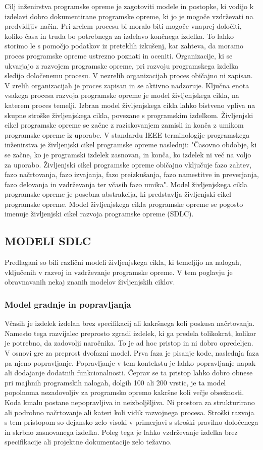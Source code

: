 \documentclass[a4paper,12pt,openright]{book}
\begin{document}
Cilj inženirstva programske opreme je zagotoviti modele in postopke, ki vodijo k izdelavi dobro dokumentirane programske opreme, ki jo je mogoče vzdrževati na predvidljiv način. Pri zrelem procesu bi moralo biti mogoče vnaprej določiti, koliko časa in truda bo potrebnega za izdelavo končnega izdelka. To lahko storimo le s pomočjo podatkov iz preteklih izkušenj, kar zahteva, da moramo proces programske opreme ustrezno poznati in oceniti.
Organizacije, ki se ukvarjajo z razvojem programske opreme, pri razvoju programskega izdelka sledijo določenemu procesu. V nezrelih organizacijah proces običajno ni zapisan. V zrelih organizacijah je proces zapisan in se aktivno nadzoruje. Ključna enota vsakega procesa razvoja programske opreme je model življenjskega cikla, na katerem proces temelji. Izbran model življenjskega cikla lahko bistveno vpliva na skupne stroške življenjskega cikla, povezane s programskim izdelkom. Življenjski cikel programske opreme se začne z raziskovanjem zamisli in konča z umikom programske opreme iz uporabe.
V standardu IEEE terminologije programskega inženirstva je življenjski cikel programske opreme naslednji:
"Časovno obdobje, ki se začne, ko je programski izdelek zasnovan, in konča, ko izdelek ni več na voljo za uporabo. Življenjski cikel programske opreme običajno vključuje fazo zahtev, fazo načrtovanja, fazo izvajanja, fazo preizkušanja, fazo namestitve in preverjanja, fazo delovanja in vzdrževanja ter včasih fazo umika".
Model življenjskega cikla programske opreme je posebna abstrakcija, ki predstavlja življenjski cikel programske opreme. Model življenjskega cikla programske opreme se pogosto imenuje življenjski cikel razvoja programske opreme (SDLC).
\subsection{MODELI SDLC}

Predlagani so bili različni modeli življenjskega cikla, ki temeljijo na nalogah, vključenih v razvoj in vzdrževanje programske opreme. V tem poglavju je obravnavanih nekaj znanih modelov življenjskih ciklov.
\subsubsection{Model gradnje in popravljanja}
Včasih je izdelek izdelan brez specifikacij ali kakršnega koli poskusa načrtovanja. Namesto tega razvijalec preprosto zgradi izdelek, ki ga predela tolikokrat, kolikor je potrebno, da zadovolji naročnika.
To je ad hoc pristop in ni dobro opredeljen. V osnovi gre za preprost dvofazni model. Prva faza je pisanje kode, naslednja faza pa njeno popravljanje. Popravljanje v tem kontekstu je lahko popravljanje napak ali dodajanje dodatnih funkcionalnosti.
Čeprav se ta pristop lahko dobro obnese pri majhnih programskih nalogah, dolgih 100 ali 200 vrstic, je ta model popolnoma nezadovoljiv za programsko opremo kakršne koli večje obsežnosti. Koda kmalu postane nepopravljiva in neizboljšljiva. Ni prostora za strukturirano ali podrobno načrtovanje ali kateri koli vidik razvojnega procesa. Stroški razvoja s tem pristopom so dejansko zelo visoki v primerjavi s stroški pravilno določenega in skrbno zasnovanega izdelka. Poleg tega je lahko vzdrževanje izdelka brez specifikacije ali projektne dokumentacije zelo težavno.
\end{document}
